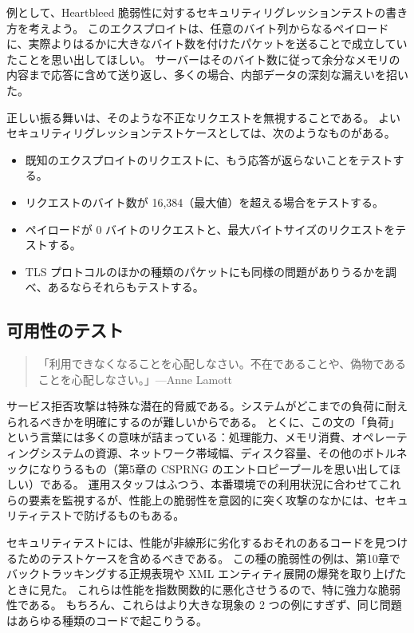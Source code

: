 \documentclass[uplatex]{jsarticle}
\def\label#1{}%
\begin{document}
\begin{exa}\label{exa:ch12-heartbleed-regression}
例として、Heartbleed 脆弱性に対するセキュリティリグレッションテストの書き方を考えよう。
このエクスプロイトは、任意のバイト列からなるペイロードに、実際よりはるかに大きなバイト数を付けたパケットを送ることで成立していたことを思い出してほしい。
サーバーはそのバイト数に従って余分なメモリの内容まで応答に含めて送り返し、多くの場合、内部データの深刻な漏えいを招いた。

正しい振る舞いは、そのような不正なリクエストを無視することである。
よいセキュリティリグレッションテストケースとしては、次のようなものがある。
\begin{itemize}
\item 既知のエクスプロイトのリクエストに、もう応答が返らないことをテストする。
\item リクエストのバイト数が 16,384（最大値）を超える場合をテストする。
\item ペイロードが 0 バイトのリクエストと、最大バイトサイズのリクエストをテストする。
\item TLS プロトコルのほかの種類のパケットにも同様の問題がありうるかを調べ、あるならそれらもテストする。
\end{itemize}
\end{exa}

\subsection{可用性のテスト}

\begin{quote}
「利用できなくなることを心配しなさい。不在であることや、偽物であることを心配しなさい。」\hfill ---Anne Lamott
\end{quote}

サービス拒否攻撃は特殊な潜在的脅威である。システムがどこまでの負荷に耐えられるべきかを明確にするのが難しいからである。
とくに、この文の「負荷」という言葉には多くの意味が詰まっている：処理能力、メモリ消費、オペレーティングシステムの資源、ネットワーク帯域幅、ディスク容量、その他のボトルネックになりうるもの（第5章の CSPRNG のエントロピープールを思い出してほしい）である。
運用スタッフはふつう、本番環境での利用状況に合わせてこれらの要素を監視するが、性能上の脆弱性を意図的に突く攻撃のなかには、セキュリティテストで防げるものもある。

セキュリティテストには、性能が非線形に劣化するおそれのあるコードを見つけるためのテストケースを含めるべきである。
この種の脆弱性の例は、第10章でバックトラッキングする正規表現や XML エンティティ展開の爆発を取り上げたときに見た。
これらは性能を指数関数的に悪化させうるので、特に強力な脆弱性である。
もちろん、これらはより大きな現象の 2 つの例にすぎず、同じ問題はあらゆる種類のコードで起こりうる。
\end{document}
